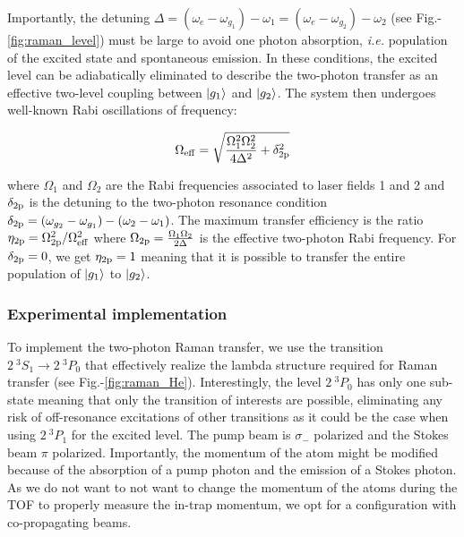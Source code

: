 Importantly, the detuning $\Delta=(\omega_{e}-\omega_{g_1})-\omega_1=(\omega_{e}-\omega_{g_2})-\omega_2$ (see Fig.-\ref{fig:raman_level}) must be large to avoid one photon absorption, {\it i.e.} population of the excited state and spontaneous emission. In these conditions, the excited level can be adiabatically eliminated to describe the two-photon transfer as an effective two-level coupling between $\ket{g_1}$ and $\ket{g_2}$. The system then undergoes well-known Rabi oscillations of frequency:

\begin{equation}
    \Omega_{\rm{eff}}= \sqrt{\frac{\Omega_1^2 \Omega_2^2}{4 \Delta^2} + \delta_{\rm{2p}}^2}
\end{equation}

\noindent where $\Omega_1$ and $\Omega_2$ are the Rabi frequencies associated to laser fields 1 and 2 and $\delta_{\rm{2p}}$ is the detuning to the two-photon resonance condition $\delta_{\rm{2p}}=(\omega_{g_2} - \omega_{g_1}) - (\omega_2-\omega_1)$. The maximum transfer efficiency is the ratio $\eta_{\rm{2p}}=\Omega_{\rm{2p}}^2 /\Omega^2_{\rm{eff}}$ where $\Omega_{\rm{2p}}=\frac{\Omega_1 \Omega_2}{2 \Delta}$ is the effective two-photon Rabi frequency. For $\delta_{\rm{2p}}=0$, we get $\eta_{\rm{2p}}=1$ meaning that it is possible to transfer the entire population of $\ket{g_1}$ to $\ket{g_2}$.



\subsubsection{Experimental implementation}

To implement the two-photon Raman transfer, we use the transition $2 \ ^3 S_1 \rightarrow 2 \ ^3 P_0$ that effectively realize the lambda structure required for Raman transfer (see Fig.-\ref{fig:raman_He}). Interestingly, the level $2 \ ^3 P_0$ has only one sub-state meaning that only the transition of interests are possible, eliminating any risk of off-resonance excitations of other transitions as it could be the case when using $2 \ ^3 P_1$ for the excited level. The pump beam is $\sigma_-$ polarized and the Stokes beam $\pi$ polarized. Importantly, the momentum of the atom might be modified because of the absorption of a pump photon and the emission of a Stokes photon. As we do not want to not want to change the momentum of the atoms during the TOF to properly measure the in-trap momentum, we opt for a configuration with co-propagating beams.

